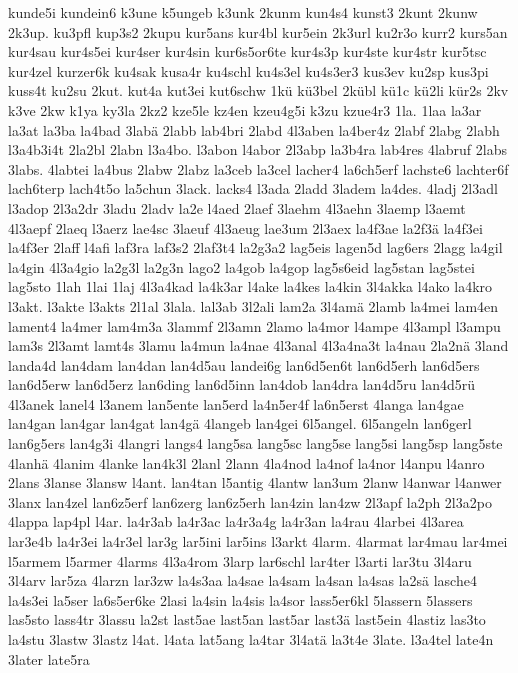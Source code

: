 {kunde5i
kundein6
k3une
k5ungeb
k3unk
2kunm
kun4s4
kunst3
2kunt
2kunw
2k3up.
ku3pfl
kup3s2
2kupu
kur5ans
kur4bl
kur5ein
2k3url
ku2r3o
kurr2
kurs5an
kur4sau
kur4s5ei
kur4ser
kur4sin
kur6s5or6te
kur4s3p
kur4ste
kur4str
kur5tsc
kur4zel
kurzer6k
ku4sak
kusa4r
ku4schl
ku4s3el
ku4s3er3
kus3ev
ku2sp
kus3pi
kuss4t
ku2su
2kut.
kut4a
kut3ei
kut6schw
1kü
kü3bel
2kübl
kü1c
kü2li
kür2s
2kv
k3ve
2kw
k1ya
ky3la
2kz2
kze5le
kz4en
kzeu4g5i
k3zu
kzue4r3
1la.
1laa
la3ar
la3at
la3ba
la4bad
3labä
2labb
lab4bri
2labd
4l3aben
la4ber4z
2labf
2labg
2labh
l3a4b3i4t
2la2bl
2labn
l3a4bo.
l3abon
l4abor
2l3abp
la3b4ra
lab4res
4labruf
2labs
3labs.
4labtei
la4bus
2labw
2labz
la3ceb
la3cel
lacher4
la6ch5erf
lachste6
lachter6f
lach6terp
lach4t5o
la5chun
3lack.
lacks4
l3ada
2ladd
3ladem
la4des.
4ladj
2l3adl
l3adop
2l3a2dr
3ladu
2ladv
la2e
l4aed
2laef
3laehm
4l3aehn
3laemp
l3aemt
4l3aepf
2laeq
l3aerz
lae4sc
3laeuf
4l3aeug
lae3um
2l3aex
la4f3ae
la2f3ä
la4f3ei
la4f3er
2laff
l4afi
laf3ra
laf3s2
2laf3t4
la2g3a2
lag5eis
lagen5d
lag6ers
2lagg
la4gil
la4gin
4l3a4gio
la2g3l
la2g3n
lago2
la4gob
la4gop
lag5s6eid
lag5stan
lag5stei
lag5sto
1lah
1lai
1laj
4l3a4kad
la4k3ar
l4ake
la4kes
la4kin
3l4akka
l4ako
la4kro
l3akt.
l3akte
l3akts
2l1al
3lala.
lal3ab
3l2ali
lam2a
3l4amä
2lamb
la4mei
lam4en
lament4
la4mer
lam4m3a
3lammf
2l3amn
2lamo
la4mor
l4ampe
4l3ampl
l3ampu
lam3s
2l3amt
lamt4s
3lamu
la4mun
la4nae
4l3anal
4l3a4na3t
la4nau
2la2nä
3land
landa4d
lan4dam
lan4dan
lan4d5au
landei6g
lan6d5en6t
lan6d5erh
lan6d5ers
lan6d5erw
lan6d5erz
lan6ding
lan6d5inn
lan4dob
lan4dra
lan4d5ru
lan4d5rü
4l3anek
lanel4
l3anem
lan5ente
lan5erd
la4n5er4f
la6n5erst
4langa
lan4gae
lan4gan
lan4gar
lan4gat
lan4gä
4langeb
lan4gei
6l5angel.
6l5angeln
lan6gerl
lan6g5ers
lan4g3i
4langri
langs4
lang5sa
lang5sc
lang5se
lang5si
lang5sp
lang5ste
4lanhä
4lanim
4lanke
lan4k3l
2lanl
2lann
4la4nod
la4nof
la4nor
l4anpu
l4anro
2lans
3lanse
3lansw
l4ant.
lan4tan
l5antig
4lantw
lan3um
2lanw
l4anwar
l4anwer
3lanx
lan4zel
lan6z5erf
lan6zerg
lan6z5erh
lan4zin
lan4zw
2l3apf
la2ph
2l3a2po
4lappa
lap4pl
l4ar.
la4r3ab
la4r3ac
la4r3a4g
la4r3an
la4rau
4larbei
4l3area
lar3e4b
la4r3ei
la4r3el
lar3g
lar5ini
lar5ins
l3arkt
4larm.
4larmat
lar4mau
lar4mei
l5armem
l5armer
4larms
4l3a4rom
3larp
lar6schl
lar4ter
l3arti
lar3tu
3l4aru
3l4arv
lar5za
4larzn
lar3zw
la4s3aa
la4sae
la4sam
la4san
la4sas
la2sä
lasche4
la4s3ei
la5ser
la6s5er6ke
2lasi
la4sin
la4sis
la4sor
lass5er6kl
5lassern
5lassers
las5sto
lass4tr
3lassu
la2st
last5ae
last5an
last5ar
last3ä
last5ein
4lastiz
las3to
la4stu
3lastw
3lastz
l4at.
l4ata
lat5ang
la4tar
3l4atä
la3t4e
3late.
l3a4tel
late4n
3later
late5ra
}

